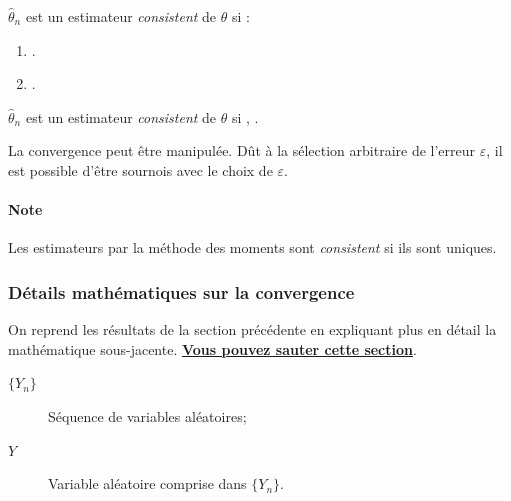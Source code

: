 \documentclass[french]{article}
\begin{document}
\begin{multicols*}{2}
\begin{definitionNOHFILL}
$\hat{\theta}_{n}$ est un estimateur \og \textit{consistent} \fg{} de $\theta$ si :
\begin{enumerate}[label = \circled{\arabic*}{trueblue}]
	\item	{}.
	\item	{}.
\end{enumerate}

\tcbline

$\hat{\theta}_{n}$ est un estimateur \og \textit{consistent} \fg{} de $\theta$ si , .
\end{definitionNOHFILL}


\begin{rappel_enhanced}[Limitations]
La convergence peut être manipulée. Dût à la sélection arbitraire de l'erreur $\varepsilon$, il est possible d'être sournois avec le choix de $\varepsilon$.
\end{rappel_enhanced}

\paragraph{Note}	Les estimateurs par la méthode des moments sont \og \textit{consistent} \fg{} si ils sont uniques.



\subsubsection*{Détails mathématiques sur la convergence}\label{subsubsec:ConsistencyEstimMaths}
On reprend les résultats de la section précédente en expliquant plus en détail la mathématique sous-jacente. \textbf{\underline{Vous pouvez sauter cette section}}.

\begin{definitionNOHFILL}
\begin{distributions}[Notation]
\begin{description}
	\item[$\{Y_{n}\}$]	Séquence de variables aléatoires;
	\item[$Y$]	Variable aléatoire comprise dans $\{Y_{n}\}$.
\end{description}
\end{distributions}


\end{definitionNOHFILL}
\end{multicols*}
\end{document}
